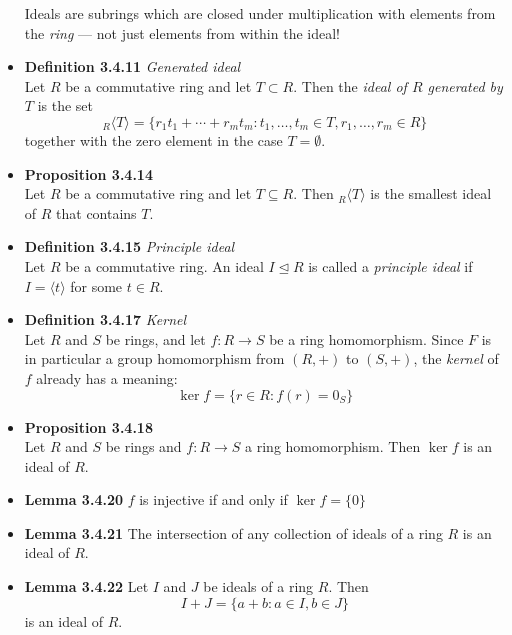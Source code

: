 \documentclass[11pt,a4paper]{article}
\begin{document}
\begin{itemize}
        Ideals are subrings which are closed under multiplication with elements from the
        \emph{ring} --- not just elements from within the ideal!

    \item \textbf{Definition 3.4.11} \emph{Generated ideal} \\
        Let $R$ be a commutative ring and let $T \subset R$.
        Then the \emph{ideal of $R$ generated by $T$} is the set
        \[
            _R\langle T \rangle = \{ {r_1}{t_1} + \cdots + {r_m}{t_m} : t_1, \ldots, t_m \in T,
            r_1, \ldots, r_m \in R \}
        \]
        together with the zero element in the case $T = \emptyset$.

    \item \textbf{Proposition 3.4.14} \\
        Let $R$ be a commutative ring and let $T \subseteq R$.
        Then $_R \langle T \rangle$ is the smallest ideal of $R$ that contains $T$.

    \item \textbf{Definition 3.4.15} \emph{Principle ideal} \\
        Let $R$ be a commutative ring.
        An ideal $I \trianglelefteq R$ is called a \emph{principle ideal} if
        $I = \langle t \rangle$ for some $t \in R$.

    \item \textbf{Definition 3.4.17} \emph{Kernel} \\
        Let $R$ and $S$ be rings, and let $f : R \to S$ be a ring homomorphism.
        Since $F$ is in particular a group homomorphism from $(R,+)$ to $(S,+)$,
        the \emph{kernel} of $f$ already has a meaning:
        \[
            \ker f = \{ r \in R : f(r) = 0_S \}
        \]

    \item \textbf{Proposition 3.4.18} \\
        Let $R$ and $S$ be rings and $f : R \to S$ a ring homomorphism.
        Then $\ker f$ is an ideal of $R$.

    \item \textbf{Lemma 3.4.20} $f$ is injective if and only if $\ker f = \{0\}$

    \item \textbf{Lemma 3.4.21} The intersection of any collection of ideals of a ring $R$
        is an ideal of $R$.

    \item \textbf{Lemma 3.4.22} Let $I$ and $J$ be ideals of a ring $R$.
        Then
        \[
            I + J = \{a + b : a \in I, b \in J \}
        \]
        is an ideal of $R$.


\end{itemize}
\end{document}
